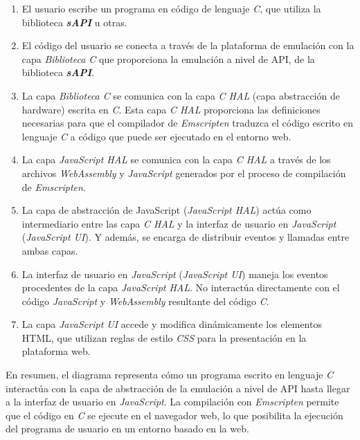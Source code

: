 \begin{enumerate}
	\item El usuario escribe un programa en código de lenguaje \textit{C}, que utiliza la biblioteca \textit{\textbf{sAPI}} u otras. 
	
	\item El código del usuario se conecta a través de la plataforma de emulación con la capa 
\textit{Biblioteca C} que proporciona la emulación a nivel de API, de la biblioteca \textit{\textbf{sAPI}}.
	
	\item La capa \textit{Biblioteca C} se comunica con la capa \textit{C HAL} (capa abstracción de hardware) escrita en \textit{C}. Esta capa \textit{C HAL} proporciona las definiciones necesarias para que el compilador de \textit{Emscripten} traduzca el código escrito en lenguaje \textit{C} a código que puede ser ejecutado en el entorno web.
	
	\item La capa \textit{JavaScript HAL} se comunica con la capa \textit{C HAL}  a través de los archivos \textit{WebAssembly} y \textit{JavaScript} generados por el proceso de compilación de \textit{Emscripten}.
	
	\item La capa de abstracción de JavaScript (\textit{JavaScript HAL}) actúa como intermediario entre las capa \textit{C HAL} y la interfaz de usuario en \textit{JavaScript} (\textit{JavaScript UI}). Y además, se encarga de distribuir eventos y llamadas entre ambas capas.
	
\item La interfaz de usuario en \textit{JavaScript} (\textit{JavaScript UI}) maneja los eventos procedentes de la capa \textit{JavaScript HAL}. No interactúa directamente con el código \textit{JavaScript} y \textit{WebAssembly} resultante del código \textit{C}.

\item La capa \textit{JavaScript UI} accede y modifica dinámicamente los elementos HTML, que utilizan reglas de estilo \textit{CSS} para la presentación en la plataforma web.
	
\end{enumerate}


En resumen, el diagrama representa cómo un programa escrito en lenguaje \textit{C} interactúa con la capa de abstracción de la emulación a nivel de API hasta llegar a la interfaz de usuario en \textit{JavaScript}. La compilación con \textit{Emscripten} permite que el código en \textit{C} se ejecute en el navegador web, lo que posibilita la ejecución del programa de usuario en un entorno basado en la web.


